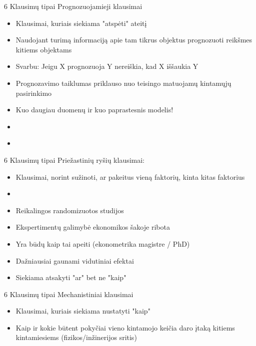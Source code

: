 \documentclass[11pt,xcolor=table]{beamer}
\begin{document}
\begin{frame}{6 Klausimų tipai}
Prognozuojamieji klausimai
\begin{itemize}
\item Klausimai, kuriais siekiama "atspėti" ateitį 
\item Naudojant turimą informaciją apie tam tikrus objektus prognozuoti reikšmes kitiems objektams
\item Svarbu: Jeigu X prognozuoja Y nereiškia, kad X iššaukia Y
\item Prognozavimo taiklumas priklauso nuo teisingo matuojamų kintamųjų pasirinkimo
\item Kuo daugiau duomenų ir kuo paprastesnis modelis!
\item \href{https://fivethirtyeight.com/}{\color{blue}{https://fivethirtyeight.com/}}
\item \href{https://www.amazon.com/Lenovo-ThinkPad-Performance-Business-fingerprint/dp/B077GP6G9M/ref=sr_1_fkmr1_1?keywords=ibm+thinkpad+t460&qid=1549818100&s=gateway&sr=8-1-fkmr1}{\color{blue}{AMAZON IBM E570}}
\end{itemize}
\end{frame}
\begin{frame}{6 Klausimų tipai}
Priežastinių ryšių klausimai:

\begin{itemize}
\item Klausimai, norint sužinoti, ar pakeitus vieną faktorių, kinta kitas faktorius
\item \href{http://psyking.net/HTMLobj-4363/Effects_of_Sleep_Deprivation-Schumacher_and_Sipes-Final.pdf}{\color{blue}{How  does  a  lack  of  sleep  impact  memory,  problem  solvingand  critical  thinking  skills  amongstcollege students?}}
\item Reikalingos randomizuotos studijos
\item Ekspertimentų galimybė ekonomikos šakoje ribota
\item Yra būdų kaip tai apeiti (ekonometrika magistre / PhD)
\item Dažniausiai gaunami vidutiniai efektai
\item Siekiama atsakyti "ar" bet ne "kaip"
\end{itemize}
\end{frame}
\begin{frame}{6 Klausimų tipai}
Mechanistiniai klausimai
\begin{itemize}
\item Klausimai, kuriais siekiama nustatyti "kaip"
\item Kaip ir kokie būtent pokyčiai vieno kintamojo keičia daro įtaką kitiems kintamiesiems (fizikos/inžinerijos sritis)
\end{itemize}
\end{frame}
\end{document}
